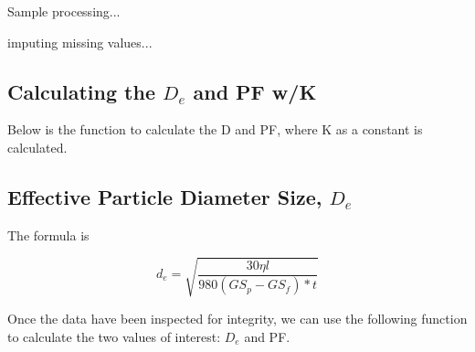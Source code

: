 Sample processing...

imputing missing values...

\subsection{Calculating the $D_e$ and PF w/K}

Below is the function to calculate the D and PF, where K as a constant is calculated. 

\subsection{Effective Particle Diameter Size, $D_e$}

The formula is 

\begin{equation}
d_e = \sqrt{\frac{30 \eta l}{980 (GS_p - GS_f)* t}}
\end{equation}

Once the data have been inspected for integrity, we can use the following function to calculate the two values of interest: $D_e$ and PF. 

